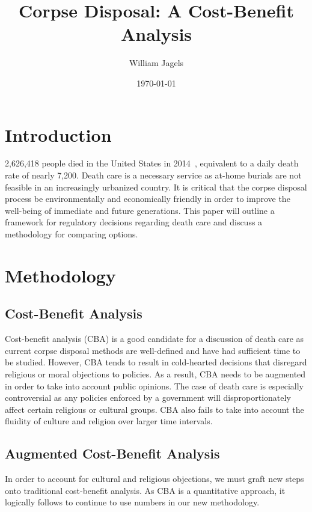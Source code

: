 \documentclass[a4paper,12pt]{article}
\begin{document}
\title{Corpse Disposal: A Cost-Benefit Analysis}
\author{William Jagels}
\date{\today}
\begin{titlepage}
  \clearpage
  \maketitle
  \thispagestyle{empty}
\end{titlepage}

\section{Introduction}
2,626,418 people died in the United States in 2014~\cite{mortality}, equivalent to a daily death rate of nearly 7,200.
Death care is a necessary service as at-home burials are not feasible in an increasingly urbanized country.
It is critical that the corpse disposal process be environmentally and economically friendly in order to improve the well-being of immediate and future generations.
This paper will outline a framework for regulatory decisions regarding death care and discuss a methodology for comparing options.

\section{Methodology}
\subsection{Cost-Benefit Analysis}
Cost-benefit analysis (CBA) is a good candidate for a discussion of death care as current corpse disposal methods are well-defined and have had sufficient time to be studied.
However, CBA tends to result in cold-hearted decisions that disregard religious or moral objections to policies.
As a result, CBA needs to be augmented in order to take into account public opinions.
The case of death care is especially controversial as any policies enforced by a government will disproportionately affect certain religious or cultural groups.
CBA also fails to take into account the fluidity of culture and religion over larger time intervals.
\subsection{Augmented Cost-Benefit Analysis}
In order to account for cultural and religious objections, we must graft new steps onto traditional cost-benefit analysis\@.
As CBA is a quantitative approach, it logically follows to continue to use numbers in our new methodology.
\end{document}
